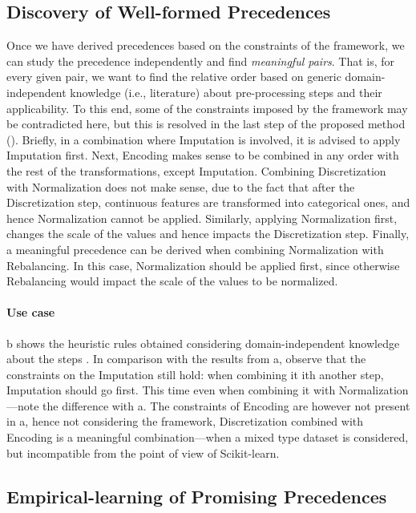 \subsection{Discovery of Well-formed Precedences}
\label{effective-ssec:rules-heuristics}
Once we have derived precedences based on the constraints of the framework, we can study the precedence independently and find \textit{meaningful pairs}.
That is, for every given pair, we want to find the relative order based on generic domain-independent knowledge (i.e., literature) about pre-processing steps and their applicability.
To this end, some of the constraints imposed by the framework may be contradicted here, but this is resolved in the last step of the proposed method ().
Briefly, in a combination where Imputation is involved, it is advised to apply Imputation first.
Next, Encoding makes sense to be combined in any order with the rest of the transformations, except Imputation.
Combining Discretization with Normalization does not make sense, due to the fact that after the Discretization step, continuous features are transformed into categorical ones, and hence Normalization cannot be applied.
Similarly, applying Normalization first, changes the scale of the values and hence impacts the Discretization step.
Finally, a meaningful precedence can be derived when combining Normalization with Rebalancing.
In this case, Normalization should be applied first, since otherwise Rebalancing would impact the scale of the values to be normalized.

\paragraph{Use case}
b shows the heuristic rules obtained considering domain-independent knowledge about the steps \cite{BookExploratoryDM03Dasu}.
In comparison with the results from a, observe that the constraints on the Imputation still hold: when combining it ith another step, Imputation should go first.
This time even when combining it with Normalization---note the difference with a.
The constraints of Encoding are however not present in a, hence not considering the framework, Discretization combined with Encoding is a meaningful combination---when a mixed type dataset is considered, but incompatible from the point of view of Scikit-learn.

\subsection{Empirical-learning of Promising Precedences}
\label{effective-ssec:rules-learned}

